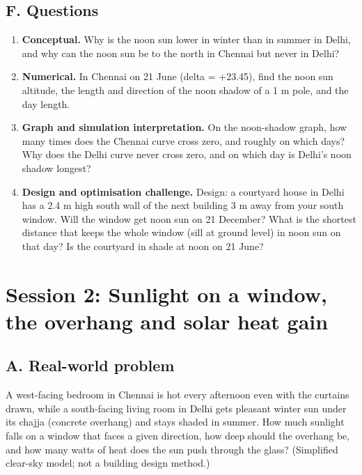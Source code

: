 \documentclass[11pt,a4paper]{article}
\begin{document}
\subsection*{F. Questions}
\begin{enumerate}[nosep]
\item \textbf{Conceptual.} Why is the noon sun lower in winter than in summer in Delhi, and why can the noon sun be to the north in Chennai but never in Delhi?
\item \textbf{Numerical.} In Chennai on 21 June (delta = +23.45), find the noon sun altitude, the length and direction of the noon shadow of a 1 m pole, and the day length.
\item \textbf{Graph and simulation interpretation.} On the noon-shadow graph, how many times does the Chennai curve cross zero, and roughly on which days? Why does the Delhi curve never cross zero, and on which day is Delhi's noon shadow longest?
\item \textbf{Design and optimisation challenge.} Design: a courtyard house in Delhi has a 2.4 m high south wall of the next building 3 m away from your south window. Will the window get noon sun on 21 December? What is the shortest distance that keeps the whole window (sill at ground level) in noon sun on that day? Is the courtyard in shade at noon on 21 June?
\end{enumerate}

\section{Session 2: Sunlight on a window, the overhang and solar heat gain}

\subsection*{A. Real-world problem}
A west-facing bedroom in Chennai is hot every afternoon even with the curtains drawn, while a south-facing living room in Delhi gets pleasant winter sun under its chajja (concrete overhang) and stays shaded in summer. How much sunlight falls on a window that faces a given direction, how deep should the overhang be, and how many watts of heat does the sun push through the glass? (Simplified clear-sky model; not a building design method.)
\end{document}
